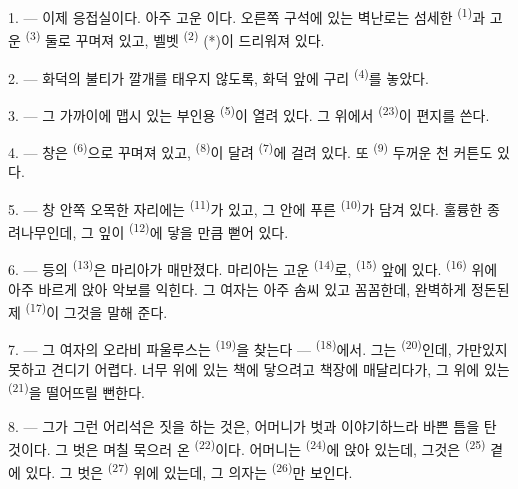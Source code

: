 1. --- 이제 응접실이다. 아주 고운 이다. 오른쪽 구석에 있는 벽난로는 섬세한
 \textsuperscript{(1)}과 고운  \textsuperscript{(3)} 둘로
꾸며져 있고, 벨벳  \textsuperscript{(2)} (*)이 드리워져 있다.

2. --- 화덕의 불티가 깔개를 태우지 않도록, 화덕 앞에 구리 
\textsuperscript{(4)}를 놓았다.

3. --- 그 가까이에 맵시 있는 부인용  \textsuperscript{(5)}이 열려 있다. 그
위에서  \textsuperscript{(23)}이 편지를 쓴다.

4. --- 창은  \textsuperscript{(6)}으로 꾸며져 있고, 
\textsuperscript{(8)}이 달려  \textsuperscript{(7)}에 걸려 있다. 또
 \textsuperscript{(9)} 두꺼운 천 커튼도 있다.

5. --- 창 안쪽 오목한 자리에는  \textsuperscript{(11)}가 있고, 그
안에 푸른  \textsuperscript{(10)}가 담겨 있다. 훌륭한 종려나무인데, 그 잎이
 \textsuperscript{(12)}에 닿을 만큼 뻗어 있다.

6. --- 등의  \textsuperscript{(13)}은 마리아가 매만졌다. 마리아는 고운
 \textsuperscript{(14)}로,  \textsuperscript{(15)} 앞에 있다.
 \textsuperscript{(16)} 위에 아주 바르게 앉아 악보를 익힌다. 그 여자는 아주
솜씨 있고 꼼꼼한데, 완벽하게 정돈된 제  \textsuperscript{(17)}이 그것을
말해 준다.

\VUsaut{5.0mm}
\VUsaut{3.0mm}

7. --- 그 여자의 오라비 파울루스는  \textsuperscript{(19)}을 찾는다 —
 \textsuperscript{(18)}에서. 그는  \textsuperscript{(20)}인데,
가만있지 못하고 견디기 어렵다. 너무 위에 있는 책에 닿으려고 책장에 매달리다가, 그 위에
있는  \textsuperscript{(21)}을 떨어뜨릴 뻔한다.

8. --- 그가 그런 어리석은 짓을 하는 것은, 어머니가 벗과 이야기하느라 바쁜 틈을 탄
것이다. 그 벗은 며칠 묵으러 온  \textsuperscript{(22)}이다. 어머니는
 \textsuperscript{(24)}에 앉아 있는데, 그것은 
\textsuperscript{(25)} 곁에 있다. 그 벗은  \textsuperscript{(27)} 위에 있는데,
그 의자는  \textsuperscript{(26)}만 보인다.

